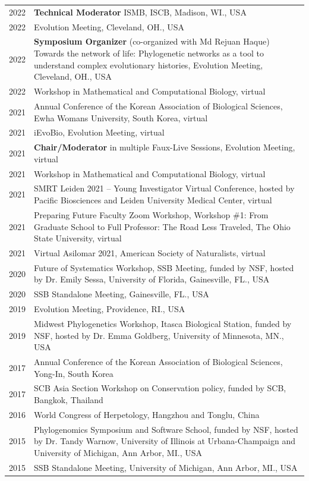 \documentclass[11pt]{article}
\begin{document}
\begin{longtable}{p{}  p{}}

2022 &\textbf{Technical Moderator} ISMB, ISCB, Madison, WI., USA\\
2022 & Evolution Meeting, Cleveland, OH., USA\\
2022 & \textbf{Symposium Organizer} (co-organized with Md Rejuan Haque) Towards the network of life: Phylogenetic networks as a tool to understand complex evolutionary histories, Evolution Meeting, Cleveland, OH., USA\\
2022 & Workshop in Mathematical and Computational Biology, virtual\\
2021 & Annual Conference of the Korean Association of Biological Sciences, Ewha Womans University, South Korea, virtual\\
2021 & iEvoBio, Evolution Meeting, virtual\\
2021 & \textbf{Chair/Moderator} in multiple Faux-Live Sessions, Evolution Meeting, virtual\\
2021 & Workshop in Mathematical and Computational Biology, virtual\\
2021 & SMRT Leiden 2021 – Young Investigator Virtual Conference, hosted by Pacific Biosciences and Leiden University Medical Center, virtual\\
2021 & Preparing Future Faculty Zoom Workshop, Workshop \#1: From Graduate School to Full Professor: The Road Less Traveled, The Ohio State University, virtual\\
2021 & Virtual Asilomar 2021, American Society of Naturalists, virtual\\
2020 & Future of Systematics Workshop, SSB Meeting, funded by NSF, hosted by Dr. Emily Sessa, University of Florida, Gainesville, FL., USA\\
2020 & SSB Standalone Meeting, Gainesville, FL., USA\\
2019 & Evolution Meeting, Providence, RI., USA\\
2019 & Midwest Phylogenetics Workshop, Itasca Biological Station, funded by NSF, hosted by Dr. Emma Goldberg, University of Minnesota, MN., USA\\
2017 & Annual Conference of the Korean Association of Biological Sciences, Yong-In, South Korea\\
2017 & SCB Asia Section Workshop on Conservation policy, funded by SCB, Bangkok, Thailand\\
2016 & World Congress of Herpetology, Hangzhou and Tonglu, China\\
2015 & Phylogenomics Symposium and Software School, funded by NSF, hosted by Dr. Tandy Warnow, University of Illinois at Urbana-Champaign and University of Michigan, Ann Arbor, MI., USA\\
2015 & SSB Standalone Meeting, University of Michigan, Ann Arbor, MI., USA\vspace{5pt}\\
\end{longtable}
\end{document}
